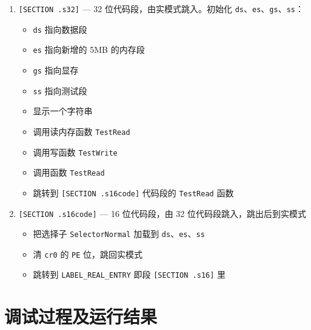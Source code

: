 \begin{enumerate}
    \item \texttt{[SECTION .s32]} --- 32 位代码段，由实模式跳入。初始化 \texttt{ds}、\texttt{es}、\texttt{gs}、\texttt{ss}：
    \begin{itemize}
        \item \texttt{ds} 指向数据段
        \item \texttt{es} 指向新增的 5MB 的内存段
        \item \texttt{gs} 指向显存
        \item \texttt{ss} 指向测试段
        \item 显示一个字符串
        \item 调用读内存函数 \texttt{TestRead}
        \item 调用写函数 \texttt{TestWrite}
        \item 调用函数 \texttt{TestRead}
        \item 跳转到 \texttt{[SECTION .s16code]} 代码段的 \texttt{TestRead} 函数
    \end{itemize}
    
    \item \texttt{[SECTION .s16code]} --- 16 位代码段，由 32 位代码段跳入，跳出后到实模式
    \begin{itemize}
        \item 把选择子 \texttt{SelectorNormal} 加载到 \texttt{ds}、\texttt{es}、\texttt{ss}
        \item 清 \texttt{cr0} 的 \texttt{PE} 位，跳回实模式
        \item 跳转到 \texttt{LABEL\_REAL\_ENTRY} 即段 \texttt{[SECTION .s16]} 里
    \end{itemize}
\end{enumerate}


\section{调试过程及运行结果}

